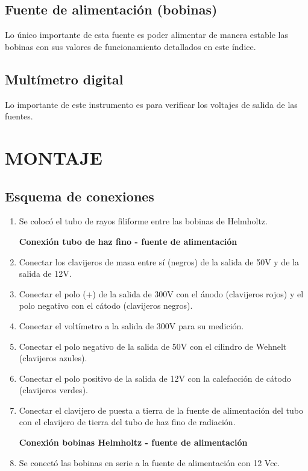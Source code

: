 \documentclass[a4paper]{article}
\begin{document}
    \subsection{Fuente de alimentación (bobinas)} 

        \indent Lo único importante de esta fuente es poder alimentar de manera estable las bobinas con sus valores de funcionamiento detallados en este índice.
       
\newpage
\noindent
\thispagestyle{fancy}

    \subsection{Multímetro digital}


        \indent Lo importante de este instrumento es para verificar los voltajes de salida de las fuentes.

\section{MONTAJE}
    \renewcommand{\theenumi}{\roman{enumi}}

    \subsection{Esquema de conexiones}

        \begin{enumerate}
            \item Se colocó el tubo de rayos filiforme entre las bobinas de Helmholtz.

            \textbf{Conexión tubo de haz fino - fuente de alimentación}

            \item Conectar los clavijeros de masa entre sí (negros) de la salida de 50V y de la salida de 12V.
            \item Conectar el polo (+) de la salida de 300V con el ánodo (clavijeros rojos) y el polo negativo con el cátodo (clavijeros negros).
            \item Conectar el voltímetro a la salida de 300V para su medición.
            \item Conectar el polo negativo de la salida de 50V con el cilindro de Wehnelt (clavijeros azules).
            \item Conectar el polo positivo de la salida de 12V con la calefacción de cátodo (clavijeros verdes).
            \item Conectar el clavijero de puesta a tierra de la fuente de alimentación del tubo con el clavijero de tierra del tubo de haz fino de radiación.

            \textbf{Conexión bobinas Helmholtz - fuente de alimentación}

            \item Se conectó las bobinas en serie a la fuente de alimentación con 12 Vcc.
        \end{enumerate}
\end{document}
